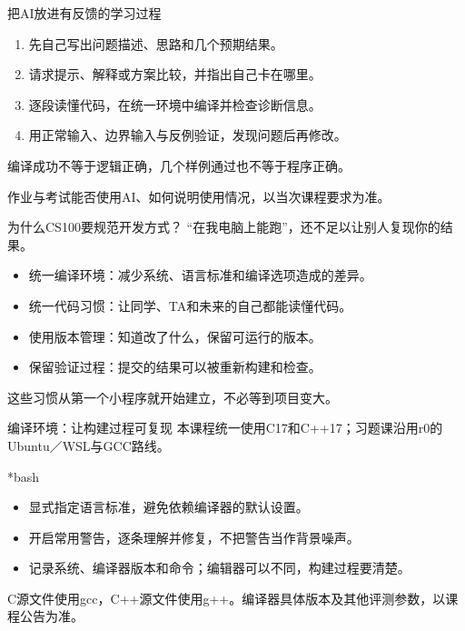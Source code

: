\begin{frame}{把AI放进有反馈的学习过程}
    \begin{enumerate}
        \item 先自己写出问题描述、思路和几个预期结果。
        \item 请求提示、解释或方案比较，并指出自己卡在哪里。
        \item 逐段读懂代码，在统一环境中编译并检查诊断信息。
        \item 用正常输入、边界输入与反例验证，发现问题后再修改。
    \end{enumerate}
    \alert{编译成功不等于逻辑正确，几个样例通过也不等于程序正确。}

    作业与考试能否使用AI、如何说明使用情况，以当次课程要求为准。
\end{frame}

\begin{frame}{为什么CS100要规范开发方式？}
    “在我电脑上能跑”，还不足以让别人复现你的结果。
    \begin{itemize}
        \item \alert{统一编译环境}：减少系统、语言标准和编译选项造成的差异。
        \item \alert{统一代码习惯}：让同学、TA和未来的自己都能读懂代码。
        \item \alert{使用版本管理}：知道改了什么，保留可运行的版本。
        \item \alert{保留验证过程}：提交的结果可以被重新构建和检查。
    \end{itemize}
    这些习惯从第一个小程序就开始建立，不必等到项目变大。
\end{frame}

\begin{frame}{编译环境：让构建过程可复现}
    本课程统一使用\alert{C17和C++17}；习题课沿用r0的Ubuntu／WSL与GCC路线。
    \begin{Code}*{bash}
        
    \end{Code}
    \begin{itemize}
        \item 显式指定语言标准，避免依赖编译器的默认设置。
        \item 开启常用警告，逐条理解并修复，不把警告当作背景噪声。
        \item 记录系统、编译器版本和命令；编辑器可以不同，构建过程要清楚。
    \end{itemize}
    \small C源文件使用gcc，C++源文件使用g++。编译器具体版本及其他评测参数，以课程公告为准。
\end{frame}

